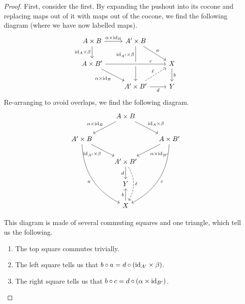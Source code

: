 \documentclass[main.tex]{subfiles}
\begin{document}
\begin{proof}
  First, consider the first. By expanding the pushout into its cocone and replacing maps out of it with maps out of the cocone, we find the following diagram (where we have now labelled maps).
  \begin{equation*}
    \begin{tikzcd}
      A \times B
      \arrow[r, "\alpha \times \id_{B}"]
      \arrow[d, swap, "\id_{A} \times \beta"]
      & A' \times B
      \arrow[dd, near start, swap, "\id_{A'} \times \beta"]
      \arrow[dr, "a"]
      \\
      A \times B'
      \arrow[rr, near end, crossing over, "c"]
      \arrow[dr, swap, "\alpha \times \id_{B}"]
      && X
      \arrow[d, "b"]
      \\
      & A' \times B'
      \arrow[ur, dashed, "\ell"]
      \arrow[r, swap, "d"]
      & Y
    \end{tikzcd}
  \end{equation*}
  Re-arranging to avoid overlaps, we find the following diagram.
  \begin{equation*}
    \begin{tikzcd}
      & A \times B
      \arrow[dr, "\id_{A} \times \beta"]
      \arrow[dl, swap, "\alpha \times \id_{B}"]
      \\
      A' \times B
      \arrow[dddr, bend right, swap, "a"]
      \arrow[dr, swap, "\id_{A'} \times \beta"]
      && A \times B'
      \arrow[dddl, bend left, "c"]
      \arrow[dl, "\alpha \times \id_{B'}"]
      \\
      & A' \times B'
      \arrow[d, swap, "d"]
      \arrow[dd, bend left, dashed, "\ell"]
      \\
      & Y
      \\
      & X
      \arrow[u, "b"]
    \end{tikzcd}
  \end{equation*}

  This diagram is made of several commuting squares and one triangle, which tell us the following.
  \begin{enumerate}
    \item The top square commutes trivially.

    \item The left square tells us that $b \circ a = d \circ (\mathrm{id}_{A'} \times \beta)$.

    \item The right square tells us that $b \circ c = d \circ (\alpha \times \mathrm{id}_{B'})$.


\end{enumerate}
\end{proof}
\end{document}
